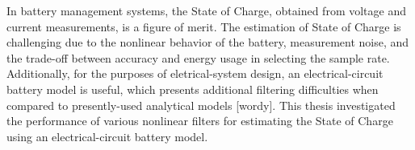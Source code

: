 In battery management systems, the State of Charge, obtained from voltage and current measurements, is a figure of merit.
The estimation of State of Charge is challenging due to the nonlinear behavior of the battery, measurement noise, and the trade-off between accuracy and energy usage in selecting the sample rate.
Additionally, for the purposes of eletrical-system design, an electrical-circuit battery model is useful, which presents additional filtering difficulties when compared to presently-used analytical models [wordy].
This thesis investigated the performance of various nonlinear filters for estimating the State of Charge using an electrical-circuit battery model.
